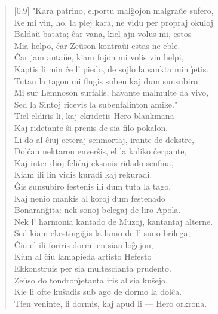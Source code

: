 \begin{verse}[0.9\textwidth]
           \vin  "Kara patrino, elportu mal\^gojon malgra\u ue sufero,\\
          Ke mi vin, ho, la plej kara, ne vidu per propraj okuloj\\
          Balda\u u batata; \^car vana, kiel ajn volus mi, estos\\
          Mia helpo, \^car Ze\u uson kontra\u ui estas ne eble.\\
          \^Car jam anta\u ue, kiam fojon mi volis vin helpi,\\
          Kaptis li min \^ce l' piedo, de sojlo la sankta min \^{\j}etis.\\
          Tutan la tagon mi flugis suben kaj dum sunsubiro\\
          Mi sur Lemnoson surfalis, havante malmulte da vivo,\\
          Sed la Sintoj ricevis la subenfalinton amike."\\
          \vin   Tiel eldiris li, kaj ekridetis Hero blankmana\\
          Kaj ridetante \^si prenis de sia filo pokalon.\\
          Li do al \^ciuj ceteraj senmortaj, irante de dekstre,\\
          Dol\^can nektaron enver\^sis, el la kaliko \^cerpante,\\
          Kaj inter dioj feli\^caj eksonis ridado senfina,\\
          Kiam ili lin vidis kuradi kaj rekuradi.\\
           \vin  \^Gis sunsubiro festenis ili dum tuta la tago,\\
          Kaj nenio mankis al koroj dum festenado\\
          Bonaran\^gita: nek sonoj belegaj de liro Apola.\\
          Nek l' harmonia kantado de Muzoj, kantantaj alterne.\\
          \vin   Sed kiam ekestingi\^gis la lumo de l' suno brilega,\\
          \^Ciu el ili foriris dormi en sian lo\^gejon,\\
          Kiun al \^ciu lamapieda artisto Hefesto\\
          Ekkonstruis per sia multescianta prudento.\\
          Ze\u uso do tondron\^{\j}etanta iris al sia ku\^sejo,\\
          Kie li ofte ku\^sadis sub ago de dormo la dol\^ca.\\
          Tien veninte, li dormis, kaj apud li --- Hero orkrona.
\end{verse}
